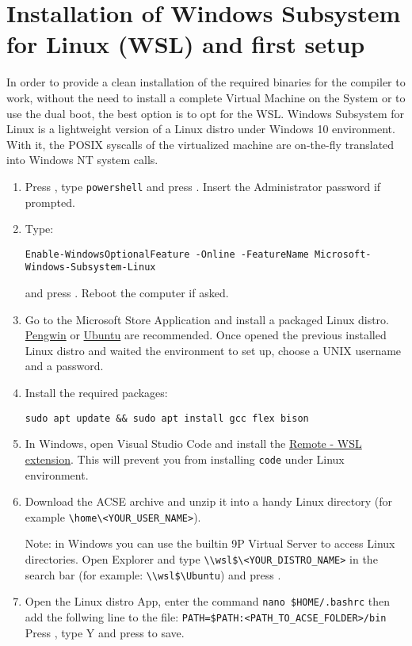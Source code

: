 \documentclass{article}
\begin{document}
\section{Installation of Windows Subsystem for Linux (WSL) and first setup}
In order to provide a clean installation of the required binaries for the compiler to work, without the need to install 
a complete Virtual Machine on the System or to use the dual boot, the best option is to opt for
the WSL. Windows Subsystem for Linux is a lightweight version of a Linux distro under Windows 10 environment.
With it, the POSIX syscalls of the virtualized machine are on-the-fly translated into Windows NT system calls.
\begin{enumerate}
    \item Press , type \verb'powershell' and press \keys{\ctrl + \shift + \enter}. Insert the Administrator password if prompted.
    \item Type: 
    \begin{scriptsize}{\begin{verbatim}Enable-WindowsOptionalFeature -Online -FeatureName Microsoft-Windows-Subsystem-Linux\end{verbatim}}\end{scriptsize}
    and press \keys{\enter}. Reboot the computer if asked.
    \item Go to the Microsoft Store Application and install a packaged Linux distro. \href{https://www.microsoft.com/it-it/p/pengwin/9nv1gv1pxz6p}{Pengwin} or \href{https://www.microsoft.com/it-it/p/ubuntu/9nblggh4msv6}{Ubuntu} are recommended.
    Once opened the previous installed Linux distro and waited the environment to set up, choose a UNIX username and a password.
    \item Install the required packages: 
    \begin{verbatim}sudo apt update && sudo apt install gcc flex bison\end{verbatim}
    \item In Windows, open Visual Studio Code and install the \href{https://marketplace.visualstudio.com/items?itemName=ms-vscode-remote.remote-wsl}{Remote - WSL extension}. This will prevent you from installing \verb+code+ under Linux environment.
    \item Download the ACSE archive and unzip it into a handy Linux directory (for example \verb+\home\<YOUR_USER_NAME>+). \newline \newline \begin{small} Note: in Windows you can use the builtin 9P Virtual Server to access Linux directories. Open Explorer and type \verb+\\wsl$\<YOUR_DISTRO_NAME>+ in the search bar (for example: \verb+\\wsl$\Ubuntu+) and press \keys{\enter}.\end{small}
    \item Open the Linux distro App, enter the command \verb+nano $HOME/.bashrc+ then add the follwing line to the file:
    \verb+PATH=$PATH:<PATH_TO_ACSE_FOLDER>/bin+ Press , type Y and press  to save.
  \end{enumerate}
\end{document}
